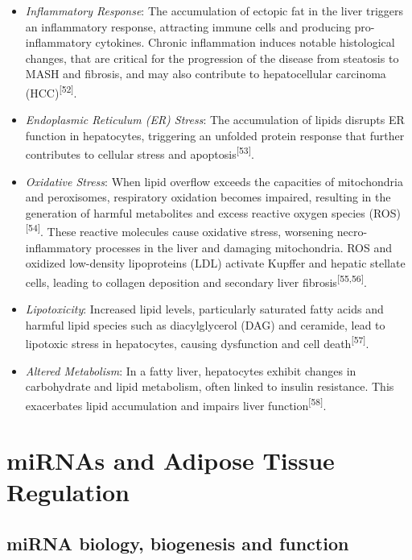\documentclass[
  11pt,
  letterpaper,
]{book}
\begin{document}
\begin{itemize}
\item
  \emph{Inflammatory Response}: The accumulation of ectopic fat in the
  liver triggers an inflammatory response, attracting immune cells and
  producing pro-inflammatory cytokines. Chronic inflammation induces
  notable histological changes, that are critical for the progression of
  the disease from steatosis to MASH and fibrosis, and may also
  contribute to hepatocellular carcinoma
  (HCC)\textsuperscript{{[}52{]}}.
\item
  \emph{Endoplasmic Reticulum (ER) Stress}: The accumulation of lipids
  disrupts ER function in hepatocytes, triggering an unfolded protein
  response that further contributes to cellular stress and
  apoptosis\textsuperscript{{[}53{]}}.
\item
  \emph{Oxidative Stress}: When lipid overflow exceeds the capacities of
  mitochondria and peroxisomes, respiratory oxidation becomes impaired,
  resulting in the generation of harmful metabolites and excess reactive
  oxygen species (ROS)\textsuperscript{{[}54{]}}. These reactive
  molecules cause oxidative stress, worsening necro-inflammatory
  processes in the liver and damaging mitochondria. ROS and oxidized
  low-density lipoproteins (LDL) activate Kupffer and hepatic stellate
  cells, leading to collagen deposition and secondary liver
  fibrosis\textsuperscript{{[}55,56{]}}.
\item
  \emph{Lipotoxicity}: Increased lipid levels, particularly saturated
  fatty acids and harmful lipid species such as diacylglycerol (DAG) and
  ceramide, lead to lipotoxic stress in hepatocytes, causing dysfunction
  and cell death\textsuperscript{{[}57{]}}.
\item
  \emph{Altered Metabolism}: In a fatty liver, hepatocytes exhibit
  changes in carbohydrate and lipid metabolism, often linked to insulin
  resistance. This exacerbates lipid accumulation and impairs liver
  function\textsuperscript{{[}58{]}}.
\end{itemize}

\section{miRNAs and Adipose Tissue
Regulation}\label{mirnas-and-adipose-tissue-regulation}

\subsection{miRNA biology, biogenesis and
function}\label{mirna-biology-biogenesis-and-function}
\end{document}

